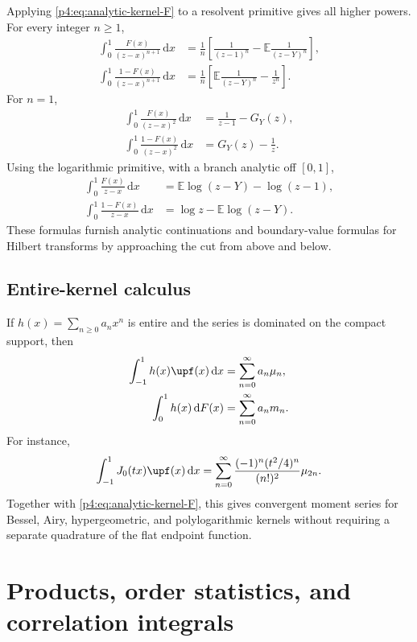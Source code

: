 \documentclass[11pt,oneside]{article}
\theoremstyle{definition}
\theoremstyle{remark}
\newcommand{\F}{F}
\newcommand{\E}{\mathbb E}
\newcommand{\dd}{\,\mathrm d}
\newcommand{\1}{\mathbf 1}
\begin{document}
Applying \cref{p4:eq:analytic-kernel-F} to a resolvent primitive gives all higher powers.
For every integer \(n\ge1\),
\begin{align}
 \int_0^1\frac{\F(x)}{(z-x)^{n+1}}\dd x
 &=\frac1n\left[\frac1{(z-1)^n}-\E\frac1{(z-Y)^n}\right],
 \label{p4:eq:resolvent-F-n}\\
 \int_0^1\frac{1-\F(x)}{(z-x)^{n+1}}\dd x
 &=\frac1n\left[\E\frac1{(z-Y)^n}-\frac1{z^n}\right].
 \label{p4:eq:resolvent-up-n}
\end{align}
For \(n=1\),
\begin{align}
 \int_0^1\frac{\F(x)}{(z-x)^2}\dd x
 &=\frac1{z-1}-G_Y(z),\label{p4:eq:resolvent-F-2}\\
 \int_0^1\frac{1-\F(x)}{(z-x)^2}\dd x
 &=G_Y(z)-\frac1z.\label{p4:eq:resolvent-up-2}
\end{align}
Using the logarithmic primitive, with a branch analytic off \([0,1]\),
\begin{align}
 \int_0^1\frac{\F(x)}{z-x}\dd x
 &=\E\log(z-Y)-\log(z-1),
 \label{p4:eq:log-resolvent-F}\\
 \int_0^1\frac{1-\F(x)}{z-x}\dd x
 &=\log z-\E\log(z-Y).
 \label{p4:eq:log-resolvent-up}
\end{align}
These formulas furnish analytic continuations and boundary-value formulas for Hilbert
transforms by approaching the cut from above and below.

\subsection{Entire-kernel calculus}

If \(h(x)=\sum_{n\ge0}a_nx^n\) is entire and the series is dominated on the compact
support, then
\begin{align}
 \int_{-1}^1h(x)\upf(x)\dd x
 &=\sum_{n=0}^{\infty}a_n\mu_n,
 \label{p4:eq:entire-kernel-up}\\
 \int_0^1h(x)\dd\F(x)
 &=\sum_{n=0}^{\infty}a_nm_n.
 \label{p4:eq:entire-kernel-dF}
\end{align}
For instance,
\begin{equation}\label{p4:eq:Bessel-up}
 \int_{-1}^1J_0(tx)\upf(x)\dd x
 =\sum_{n=0}^{\infty}
 \frac{(-1)^n(t^2/4)^n}{(n!)^2}\mu_{2n}.
\end{equation}
Together with \cref{p4:eq:analytic-kernel-F}, this gives convergent moment series for
Bessel, Airy, hypergeometric, and polylogarithmic kernels without requiring a separate
quadrature of the flat endpoint function.

\section{Products, order statistics, and correlation integrals}
\end{document}
